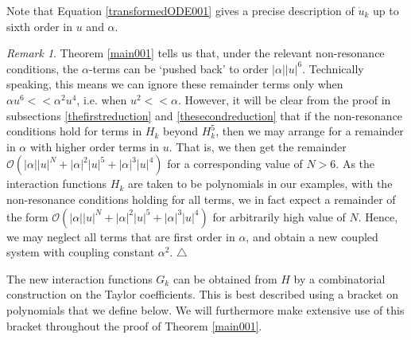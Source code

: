 \documentclass[12pt]{article}
\renewcommand{\mathcal}{\mathscr}
\theoremstyle{plain}
\theoremstyle{definition}
\theoremstyle{remark}
\newtheorem{remk}[thr]{Remark}
\theoremstyle{remark}
\begin{document}
\noindent Note that Equation \eqref{transformedODE001} gives a precise description of $\dot{u}_k$ up to sixth order in $u$ and $\alpha$.

\begin{remk}
Theorem \ref{main001} tells us that, under the relevant non-resonance conditions, the $\alpha$-terms can be `pushed back' to order $|\alpha| |u|^6$. Technically speaking, this means we can ignore these remainder terms only when $\alpha u^6 << \alpha^2 u^4$, i.e. when $ u^2 << \alpha$. However, it will be clear from the proof in subsections \ref{thefirstreduction} and  \ref{thesecondreduction} that if the non-resonance conditions hold for terms in $H_k$ beyond ${H}_k^5$, then we may  arrange for a remainder in $\alpha$ with higher order terms in $u$. That is, we then get the remainder $\mathcal{O}(|\alpha||u|^N +|\alpha|^2|u|^5 + |\alpha|^3|u|^4 )$ for a corresponding value of $N > 6$. As the interaction functions $H_k$ are taken to be polynomials in our examples, with the non-resonance conditions holding for all terms, we in fact expect a remainder of the form $\mathcal{O}(|\alpha||u|^N +|\alpha|^2|u|^5 + |\alpha|^3|u|^4 )$ for arbitrarily high value of $N$. Hence, we may neglect all terms that are first order in $\alpha$, and obtain a new coupled system with coupling constant $\alpha^2$. \hfill $\triangle$
\end{remk}


 The new interaction functions $G_k$ can be obtained from $H$ by a combinatorial construction on the Taylor coefficients. This is best described using a bracket on polynomials that we define below. We will furthermore make extensive use of this bracket throughout the proof of Theorem \ref{main001}. 
\end{document}
